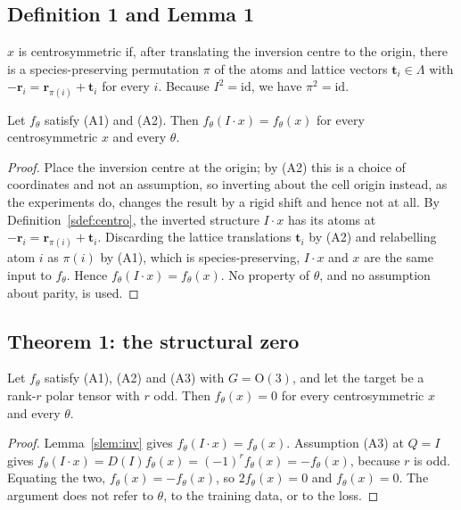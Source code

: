 \subsection*{Definition 1 and Lemma 1}

\begin{definition}\label{sdef:centro}
$x$ is centrosymmetric if, after translating the inversion centre to the origin, there is a species-preserving permutation $\pi$ of the atoms and lattice vectors $\mathbf{t}_i \in \Lambda$ with
$-\mathbf{r}_i = \mathbf{r}_{\pi(i)} + \mathbf{t}_i$ for every $i$. Because $I^{2}=\mathrm{id}$, we have $\pi^{2}=\mathrm{id}$.
\end{definition}

\begin{lemma}\label{slem:inv}
Let $f_\theta$ satisfy (A1) and (A2). Then $f_\theta(I\!\cdot\!x) = f_\theta(x)$ for every centrosymmetric $x$ and every $\theta$.
\end{lemma}

\begin{proof}
Place the inversion centre at the origin; by (A2) this is a choice of coordinates and not an assumption, so inverting about the cell origin instead, as the experiments do, changes the result by a rigid shift and hence not at all. By Definition~\ref{sdef:centro}, the inverted structure $I\!\cdot\!x$ has its atoms at $-\mathbf{r}_i = \mathbf{r}_{\pi(i)} + \mathbf{t}_i$. Discarding the lattice translations $\mathbf{t}_i$ by (A2) and relabelling atom $i$ as $\pi(i)$ by (A1), which is species-preserving, $I\!\cdot\!x$ and $x$ are the same input to $f_\theta$. Hence $f_\theta(I\!\cdot\!x) = f_\theta(x)$. No property of $\theta$, and no assumption about parity, is used.
\end{proof}

\subsection*{Theorem 1: the structural zero}

\begin{theorem}\label{sthm:zero}
Let $f_\theta$ satisfy (A1), (A2) and (A3) with $G=\mathrm{O}(3)$, and let the target be a rank-$r$ polar tensor with $r$ odd. Then $f_\theta(x)=0$ for every centrosymmetric $x$ and every $\theta$.
\end{theorem}

\begin{proof}
Lemma~\ref{slem:inv} gives $f_\theta(I\!\cdot\!x) = f_\theta(x)$. Assumption (A3) at $Q = I$ gives
$f_\theta(I\!\cdot\!x) = D(I) f_\theta(x) = (-1)^{r} f_\theta(x) = -f_\theta(x)$, because $r$ is odd.
Equating the two, $f_\theta(x) = -f_\theta(x)$, so $2 f_\theta(x) = 0$ and $f_\theta(x) = 0$. The argument does not refer to $\theta$, to the training data, or to the loss.
\end{proof}

